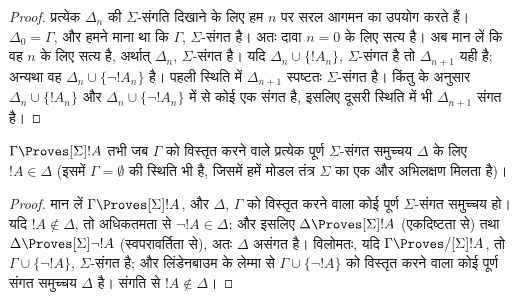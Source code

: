 \documentclass[../../../include/open-logic-section]{subfiles}
\begin{document}
\begin{proof}
प्रत्येक $\Delta_n$ की $\Sigma$-संगति दिखाने के लिए हम $n$ पर सरल आगमन
का उपयोग करते हैं। $\Delta_0 = \Gamma$, और हमने माना था कि $\Gamma$,
$\Sigma$-संगत है। अतः दावा $n = 0$ के लिए सत्य है। अब मान लें कि वह $n$
के लिए सत्य है, अर्थात् $\Delta_n$, $\Sigma$-संगत है। यदि $\Delta_n \cup
\{!A_n\}$, $\Sigma$-संगत है तो $\Delta_{n+1}$ यही है; अन्यथा वह
$\Delta_n \cup \{\lnot!A_n\}$ है। पहली स्थिति में $\Delta_{n+1}$
स्पष्टतः $\Sigma$-संगत है। किंतु
के अनुसार $\Delta_n \cup \{!A_n\}$ और $\Delta_n \cup \{\lnot!A_n\}$
में से कोई एक संगत है, इसलिए दूसरी स्थिति में भी $\Delta_{n+1}$ संगत है।
\end{proof}

\begin{cor}
  $\Gamma \Proves[\Sigma] !A$ तभी जब $\Gamma$ को विस्तृत करने वाले
  प्रत्येक पूर्ण $\Sigma$-संगत समुच्चय $\Delta$ के लिए $!A \in \Delta$
  (इसमें $\Gamma = \emptyset$ की स्थिति भी है, जिसमें हमें मोडल तंत्र
  $\Sigma$ का एक और अभिलक्षण मिलता है)।
\end{cor}

\begin{proof}
  मान लें $\Gamma \Proves[\Sigma] !A$, और $\Delta$, $\Gamma$ को विस्तृत
  करने वाला कोई पूर्ण $\Sigma$-संगत समुच्चय हो। यदि $!A \notin \Delta$,
  तो अधिकतमता से $\lnot!A \in \Delta$; और इसलिए $\Delta
  \Proves[\Sigma] !A$ (एकदिष्टता से) तथा $\Delta \Proves[\Sigma]
  \lnot!A$ (स्वपरावर्तिता से), अतः $\Delta$ असंगत है। विलोमतः, यदि
  $\Gamma \Proves/[\Sigma] !A$, तो $\Gamma \cup \{ \lnot!A\}$,
  $\Sigma$-संगत है; और लिंडेनबाउम के लेम्मा से $\Gamma \cup \{ \lnot!A
  \}$ को विस्तृत करने वाला कोई पूर्ण संगत समुच्चय $\Delta$ है। संगति से
  $!A \notin \Delta$।
\end{proof}
\end{document}
